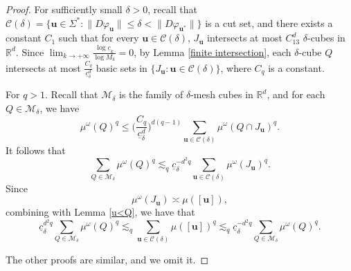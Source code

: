 \documentclass[12pt]{amsart}
\theoremstyle{plain}
\theoremstyle{definition}
\theoremstyle{remark}
\newcommand{\bu}{\mathbf{u}}
\begin{document}
\begin{proof}
For sufficiently small $\delta>0$, recall that $\mathcal{C}(\delta) =\{\mathbf{u}\in\Sigma^*: \|D\varphi_\mathbf{u}\|\le \delta< \|D\varphi_{\mathbf{u}^*}\| \}$ is a cut set, and there exists a constant $C_1$ such that for every $\mathbf{u}\in\mathcal{C}(\delta)$,  $J_\mathbf{u}$ intersects at most $C_13^d$  $\delta$-cubes in $\mathbb{R}^d$. Since $\lim_{k\to +\infty} \frac{\log\underline c_k}{\log M_k}=0$, by Lemma \ref{finite intersection}, each $\delta$-cube $Q$ intersects at most $\frac{C_q}{\underline{c}_\delta^d}$ basic sets in $\{J_\mathbf{u}:\mathbf{u}\in\mathcal{C}(\delta)\}$,  where $C_q$ is a constant.

For $q>1$. Recall that $\mathcal{M}_\delta$ is the family of $\delta$-mesh cubes in $\mathbb{R}^d$, and for each $Q\in\mathcal{M}_\delta$, we have
$$
\mu^\omega(Q)^q\le\big(\frac{C_q}{\underline{c}_\delta^d}\big)^{d(q-1)}\sum_{\mathbf{u}\in\mathcal{C}(\delta)}\mu^\omega(Q\cap J_\mathbf{u})^q.
$$
It follows that
$$
\sum_{Q\in{\mathcal{M}_\delta}}\mu^\omega(Q)^q \lesssim_q \underline{c}_\delta^{-d^2q} \sum_{\mathbf{u}\in\mathcal{C}(\delta)}\mu^\omega( J_\mathbf{u})^q.
$$
Since 
$$
\mu^\omega(J_\bu)\asymp\mu([\bu]),
$$ 
combining with Lemma \ref{u<Q}, we have that 
$$
\underline{c}_\delta^{d^2q}\sum_{Q\in{\mathcal{M}_\delta}}\mu^\omega(Q)^q\lesssim_q\sum_{\mathbf{u}\in\mathcal{C}(\delta)}\mu([\bu])^q\lesssim_q \underline{c}_\delta^{-d^2q}\sum_{Q\in{\mathcal{M}_\delta}}\mu^\omega(Q)^q. 
$$

The other proofs are similar, and we omit it.

\end{proof}
\end{document}
